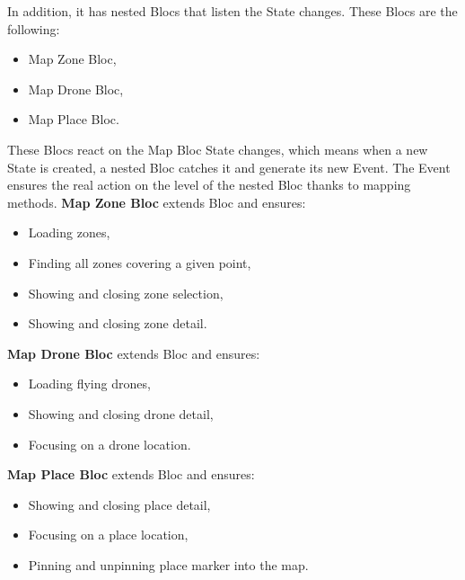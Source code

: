 \newpage

In addition, it has nested Blocs that listen the State changes.
These Blocs are the following:
\begin{itemize}
    \item Map Zone Bloc,
    \item Map Drone Bloc,
    \item Map Place Bloc.
\end{itemize}
These Blocs react on the Map Bloc State changes, which means when a new State is created, a nested Bloc catches it and generate its new Event.
The Event ensures the real action on the level of the nested Bloc thanks to mapping methods.
\newline
\newline
\textbf{Map Zone Bloc} extends Bloc and ensures:
\begin{itemize}
    \item Loading zones,
    \item Finding all zones covering a given point,
    \item Showing and closing zone selection,
    \item Showing and closing zone detail.
\end{itemize}
\textbf{Map Drone Bloc} extends Bloc and ensures:
\begin{itemize}
    \item Loading flying drones,
    \item Showing and closing drone detail,
    \item Focusing on a drone location.
\end{itemize}
\textbf{Map Place Bloc} extends Bloc and ensures:
\begin{itemize}
    \item Showing and closing place detail,
    \item Focusing on a place location,
    \item Pinning and unpinning place marker into the map.
\end{itemize}
